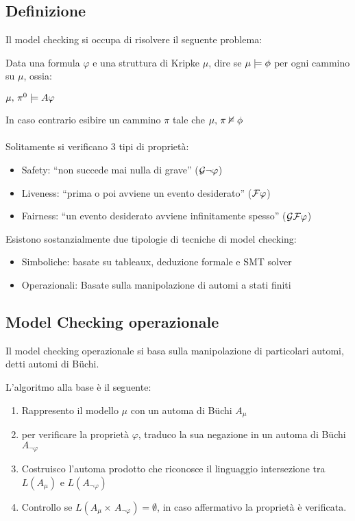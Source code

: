 \subsection{Definizione}

Il model checking si occupa di risolvere il seguente problema: 

Data una formula $\varphi$ e una struttura di Kripke $\mu$, dire
se $\mu\models\phi$ per ogni cammino su $\mu$, ossia:

$\mu,\,\pi^{0}\models A\varphi$

In caso contrario esibire un cammino $\pi$ tale che $\mu,\,\pi\nvDash\phi$\\
\\
Solitamente si verificano 3 tipi di proprietà:
\begin{itemize}
\item Safety: ``non succede mai nulla di grave'' ($\mathcal{G}\neg\varphi$)
\item Liveness: ``prima o poi avviene un evento desiderato'' ($\mathcal{F}\varphi$)
\item Fairness: ``un evento desiderato avviene infinitamente spesso''
($\mathcal{G}\mathcal{F}\varphi$)
\end{itemize}
Esistono sostanzialmente due tipologie di tecniche di model checking:
\begin{itemize}
\item Simboliche: basate su tableaux, deduzione formale e SMT solver
\item Operazionali: Basate sulla manipolazione di automi a stati finiti
\end{itemize}

\subsection{Model Checking operazionale}

Il model checking operazionale si basa sulla manipolazione di particolari
automi, detti automi di Büchi.

L'algoritmo alla base è il seguente:
\begin{enumerate}
\item Rappresento il modello $\mu$ con un automa di Büchi $A_{\mu}$
\item per verificare la proprietà $\varphi$, traduco la sua negazione in
un automa di Büchi $A_{\neg\varphi}$
\item Costruisco l'automa prodotto che riconosce il linguaggio intersezione
tra $L(A_{\mu})$ e $L(A_{\neg\varphi})$
\item Controllo se $L(A_{\mu}\times\, A_{\neg\varphi})=\emptyset$, in caso
affermativo la proprietà è verificata.
\end{enumerate}

